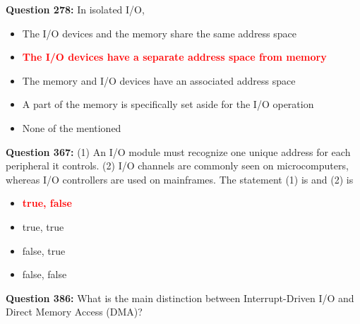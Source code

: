 \documentclass[12pt,a4paper]{article}
\begin{document}
\vspace{0.5cm}

\vspace{0.5cm}

\vspace{0.5cm}

\vspace{0.5cm}

\textbf{Question 278:} In isolated I/O,\underline{\hspace{1.5cm}}

\begin{itemize}
    \item[\textbf{A.}] The I/O devices and the memory share the same address space
    \item[\textbf{B.}] \textcolor{red}{\textbf{The I/O devices have a separate address space from memory}}
    \item[\textbf{C.}] The memory and I/O devices have an associated address space
    \item[\textbf{D.}] A part of the memory is specifically set aside for the I/O operation
    \item[\textbf{E.}] None of the mentioned
\end{itemize}

\vspace{0.5cm}

\vspace{0.5cm}

\textbf{Question 367:} (1) An I/O module must recognize one unique address for each peripheral it controls. (2) I/O channels are commonly seen on microcomputers, whereas I/O controllers are used on mainframes. The statement (1) is \underline{\hspace{1.5cm}} and (2) is \underline{\hspace{1.5cm}}

\begin{itemize}
    \item[\textbf{A.}] \textcolor{red}{\textbf{true, false}}
    \item[\textbf{B.}] true, true
    \item[\textbf{C.}] false, true
    \item[\textbf{D.}] false, false
\end{itemize}

\vspace{0.5cm}

\vspace{0.5cm}

\textbf{Question 386:} What is the main distinction between Interrupt-Driven I/O and Direct Memory Access (DMA)?
\end{document}
